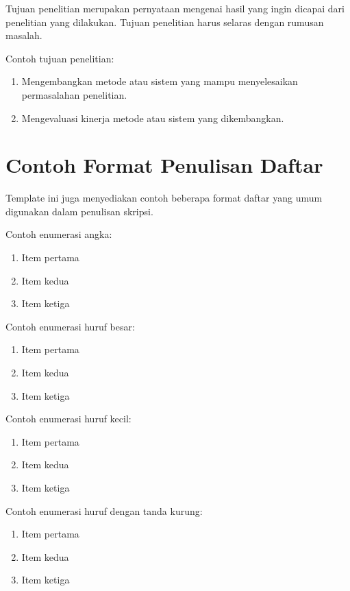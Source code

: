 Tujuan penelitian merupakan pernyataan mengenai hasil yang ingin dicapai
dari penelitian yang dilakukan. Tujuan penelitian harus selaras dengan
rumusan masalah.

Contoh tujuan penelitian:

\begin{enumerate}
\item Mengembangkan metode atau sistem yang mampu menyelesaikan
permasalahan penelitian.
\item Mengevaluasi kinerja metode atau sistem yang dikembangkan.
\end{enumerate}

\section{Contoh Format Penulisan Daftar}

Template ini juga menyediakan contoh beberapa format daftar yang umum
digunakan dalam penulisan skripsi.

Contoh enumerasi angka:

\begin{enumerate}
\item Item pertama
\item Item kedua
\item Item ketiga
\end{enumerate}

Contoh enumerasi huruf besar:

\begin{enumerate}[label=\Alph*.]
\item Item pertama
\item Item kedua
\item Item ketiga
\end{enumerate}

Contoh enumerasi huruf kecil:

\begin{enumerate}[label=\alph*.]
\item Item pertama
\item Item kedua
\item Item ketiga
\end{enumerate}

Contoh enumerasi huruf dengan tanda kurung:

\begin{enumerate}[label=\alph*)]
\item Item pertama
\item Item kedua
\item Item ketiga
\end{enumerate}